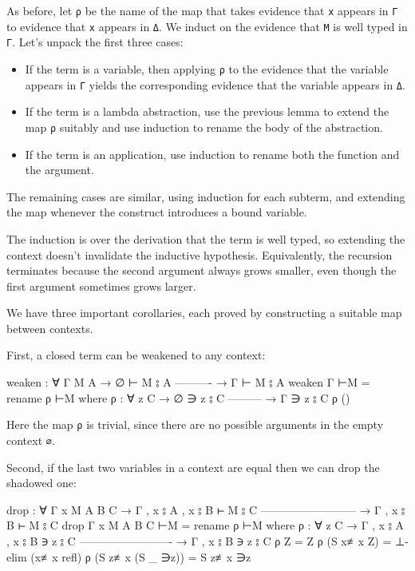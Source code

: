 As before, let \texttt{ρ} be the name of the map that takes evidence
that \texttt{x} appears in \texttt{Γ} to evidence that \texttt{x}
appears in \texttt{Δ}. We induct on the evidence that \texttt{M} is well
typed in \texttt{Γ}. Let's unpack the first three cases:

\begin{itemize}
\item
  If the term is a variable, then applying \texttt{ρ} to the evidence
  that the variable appears in \texttt{Γ} yields the corresponding
  evidence that the variable appears in \texttt{Δ}.
\item
  If the term is a lambda abstraction, use the previous lemma to extend
  the map \texttt{ρ} suitably and use induction to rename the body of
  the abstraction.
\item
  If the term is an application, use induction to rename both the
  function and the argument.
\end{itemize}

The remaining cases are similar, using induction for each subterm, and
extending the map whenever the construct introduces a bound variable.

The induction is over the derivation that the term is well typed, so
extending the context doesn't invalidate the inductive hypothesis.
Equivalently, the recursion terminates because the second argument
always grows smaller, even though the first argument sometimes grows
larger.

We have three important corollaries, each proved by constructing a
suitable map between contexts.

First, a closed term can be weakened to any context:

\begin{fence}
\begin{code}
weaken : ∀ {Γ M A}
  → ∅ ⊢ M ⦂ A
    ----------
  → Γ ⊢ M ⦂ A
weaken {Γ} ⊢M = rename ρ ⊢M
  where
  ρ : ∀ {z C}
    → ∅ ∋ z ⦂ C
      ---------
    → Γ ∋ z ⦂ C
  ρ ()
\end{code}
\end{fence}

Here the map \texttt{ρ} is trivial, since there are no possible
arguments in the empty context \texttt{∅}.

Second, if the last two variables in a context are equal then we can
drop the shadowed one:

\begin{fence}
\begin{code}
drop : ∀ {Γ x M A B C}
  → Γ , x ⦂ A , x ⦂ B ⊢ M ⦂ C
    --------------------------
  → Γ , x ⦂ B ⊢ M ⦂ C
drop {Γ} {x} {M} {A} {B} {C} ⊢M = rename ρ ⊢M
  where
  ρ : ∀ {z C}
    → Γ , x ⦂ A , x ⦂ B ∋ z ⦂ C
      -------------------------
    → Γ , x ⦂ B ∋ z ⦂ C
  ρ Z                 =  Z
  ρ (S x≢x Z)         =  ⊥-elim (x≢x refl)
  ρ (S z≢x (S _ ∋z))  =  S z≢x ∋z
\end{code}
\end{fence}

